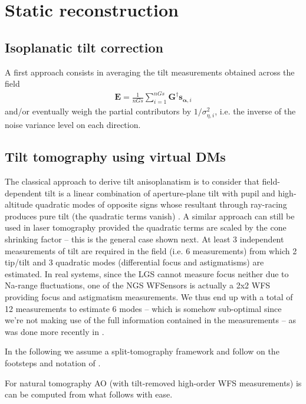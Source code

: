 \documentclass[a4paper,12pt]{article}
\newcommand{\0}{\mathsf{0}} %
\newcommand{\Emv}{\mathbf{E}} %
\newcommand{\D}{\mathbf{G}} %
\newcommand{\alphavec}{{\boldsymbol{\alpha}}}
\newcommand{\svec}{{\mathbf{s}}}
\begin{document}
\section{Static reconstruction}

\subsection{Isoplanatic tilt correction}
A first approach consists in averaging the tilt measurements obtained
across the field 
\begin{align}
\Emv = \frac{1}{nGs}\sum_{i=1}^{nGs} \D^\dag{\svec}_{\alphavec,i} 
\end{align}
and/or eventually weigh the partial contributors by
$1/\sigma^2_{\eta,i}$, i.e. the inverse of the noise variance level on
each direction.

\subsection{Tilt tomography using virtual DMs}
The classical approach to derive tilt anisoplanatism is to consider
that field-dependent tilt is a linear combination of aperture-plane
tilt with pupil and high-altitude quadratic modes of
opposite signs whose resultant through ray-racing produces pure tilt
(the quadratic terms vanish) \cite{flicker02, ellerbroek01}. A similar approach can still be used in
laser tomography provided the quadratic terms are scaled by the cone
shrinking factor -- this is the general case shown next. At least 3
independent measurements of tilt are required in the field (i.e. 6
measurements) from which 2 tip/tilt and 3 quadratic modes
(differential focus and astigmatisms) are estimated. In real systems,
since the LGS cannot measure focus neither due to Na-range
fluctuations, one of the NGS WFSensors is actually a 2x2 WFS
providing focus and astigmatism measurements. We thus end up with a
total of 12 measurements to estimate 6 modes -- which is somehow
sub-optimal since we're not making use of the full information
contained in the measurements -- as was done more recently in
\cite{gilles11a}.

In the following we assume a split-tomography framework
\cite{gilles08a} and follow on the footsteps and notation of \cite{correia13}. 

For natural
tomography AO (with tilt-removed high-order WFS measurements) is can
be computed from what follows with ease. 
\end{document}
